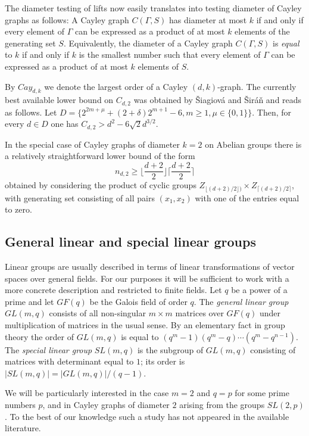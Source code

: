 \documentclass[a4paper,12pt,oneside]{report}%
\begin{document}
The diameter testing of lifts now easily translates into testing diameter of Cayley graphs as follows: A Cayley graph $C(\Gamma,S)$ has diameter at most $k$ if and only if every element of $\Gamma$ can be expressed as a product of at most $k$ elements of the generating set $S$. Equivalently, the diameter of a Cayley graph $C(\Gamma,S)$ is {\em equal} to $k$ if and only if $k$ is the smallest number such that every element of $\Gamma$ can be expressed as a product of at most $k$ elements of $S$.
\medskip

By $Cay_{d,k}$ we denote the largest order of a Cayley $(d,k)$-graph.
The currently best available lower bound on $C_{d,2}$ was obtained by \v{S}iagiov\'a and \v{S}ir\'a\v{n} \cite{Sia-Sir} and reads as follows. Let $D = \{ 2^{2m+\mu}+(2+\delta)2^{m+1}-6,m \geq 1, \mu \in \{0,1\} \}$. Then, for every $d\in D$ one has $C_{d,2} > d^{2} - 6\sqrt{2}d^{3/2}$.

In the special case of Cayley graphs of diameter $k=2$ on Abelian groups there is a relatively straightforward lower bound of the form
\begin{equation*}
	n_{d,2} \geq \lfloor \frac{d+2}{2} \rfloor \lceil \frac{d + 2}{2} \rceil
\end{equation*}	
obtained by considering the product of cyclic groups $Z_{ \lfloor (d+2)/2  \rfloor) } \times Z_{ \lceil (d+2)/2 \rceil }$, with generating set consisting of all pairs $(x_1,x_2)$ with one of the entries equal to zero.

\subsection{General linear and special linear groups}

Linear groups are usually described in terms of linear transformations of vector spaces over general fields. For our purposes it will be sufficient to work with a more concrete description and restricted to finite fields. Let $q$ be a power of a prime and let $GF(q)$ be the Galois field of order $q$. The {\em general linear group} $GL(m,q)$ consists of all non-singular $m\times m$ matrices over $GF(q)$ under multiplication of matrices in the usual sense. By an elementary fact in group theory the order of $GL(m,q)$ is equal to $(q^m - 1)(q^m - q) \cdots (q^m - q^{n-1})$. The {\em special linear group} $SL(m,q)$ is the subgroup of $GL(m,q)$ consisting of matrices with determinant equal to $1$; its order is $|SL(m,q)| = |GL(m,q)|/(q-1)$.
\medskip

We will be particularly interested in the case $m=2$ and $q=p$ for some prime numbers $p$, and in Cayley graphs of diameter $2$ arising from the groups $SL(2,p)$. To the best of our knowledge such a study has not appeared in the available literature.
\end{document}
